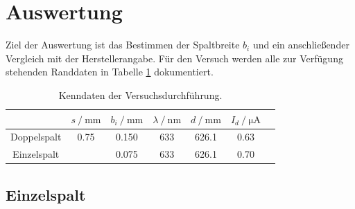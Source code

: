 \section{Auswertung}
\label{sec:Auswertung}
Ziel der Auswertung ist das Bestimmen der Spaltbreite $b_i$ und ein anschließender Vergleich mit der Herstellerangabe.
Für den Versuch werden alle zur Verfügung stehenden Randdaten in Tabelle \ref{tab:rand} dokumentiert.

\begin{table}
    \centering
    \caption{Kenndaten der Versuchsdurchführung.}
    \label{tab:rand}
    \begin{tabular}{c c c c c c c}
        \toprule
        & $s\:/\:\si{\milli\meter}$ & $b_i\:/\:\si{\milli\meter}$ & $\lambda\:/\:\si{\nano\meter}$ & $d\:/\:\si{\milli\meter}$ & $I_d\:/\:\si{\micro\ampere}$ \\
        \midrule
        Doppelspalt & 0.75 & 0.150 & 633 & 626.1 & 0.63 \\
        Einzelspalt &      & 0.075 & 633 & 626.1 & 0.70 \\
        \bottomrule
    \end{tabular}
\end{table}

\subsection{Einzelspalt}

